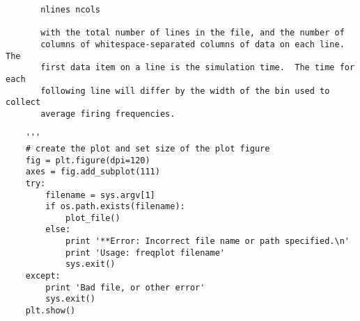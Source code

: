 \documentclass[12pt]{article}
\begin{document}
\begin{verbatim}
       nlines ncols

       with the total number of lines in the file, and the number of
       columns of whitespace-separated columns of data on each line.  The
       first data item on a line is the simulation time.  The time for each
       following line will differ by the width of the bin used to collect
       average firing frequencies.

    '''
    # create the plot and set size of the plot figure
    fig = plt.figure(dpi=120)
    axes = fig.add_subplot(111)
    try:
        filename = sys.argv[1]
        if os.path.exists(filename):            
            plot_file()
        else:
            print '**Error: Incorrect file name or path specified.\n'
            print 'Usage: freqplot filename'
            sys.exit()
    except:
        print 'Bad file, or other error'
        sys.exit()
    plt.show()
\end{verbatim}
\end{document}
